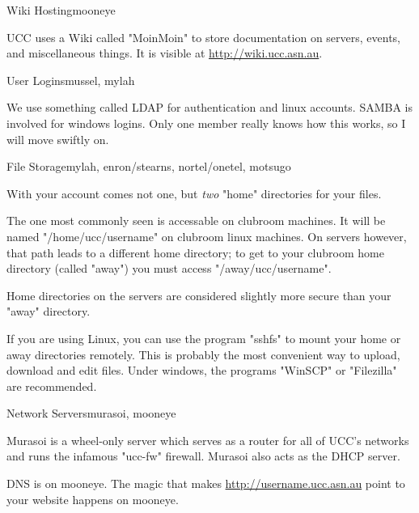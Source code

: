\begin{uccservice}{Wiki Hosting}{mooneye}

UCC uses a Wiki called "MoinMoin" to store documentation on servers, events, and miscellaneous things. It is visible at \url{http://wiki.ucc.asn.au}.

\end{uccservice}

\begin{uccservice}{User Logins}{mussel, mylah}

We use something called LDAP for authentication and linux accounts. SAMBA is involved for windows logins. Only one member really knows how this works, so I will move swiftly on.

\end{uccservice}

\begin{uccservice}{File Storage}{mylah, enron/stearns, nortel/onetel, motsugo}

With your account comes not one, but \emph{two} "home" directories for your files.

The one most commonly seen is accessable on clubroom machines. It will be named "/home/ucc/username" on clubroom linux machines. On servers however, that path leads to a different home directory; to get to your clubroom home directory (called "away") you must access "/away/ucc/username".

Home directories on the servers are considered slightly more secure than your "away" directory. 


If you are using Linux, you can use the program "sshfs" to mount your home or away directories remotely. This is probably the most convenient way to upload, download and edit files. Under windows, the programs "WinSCP" or "Filezilla" are recommended.


\end{uccservice}

\begin{uccservice}{Network Servers}{murasoi, mooneye}

Murasoi is a wheel-only server which serves as a router for all of UCC's networks and runs the infamous "ucc-fw" firewall. Murasoi also acts as the DHCP server.

DNS is on mooneye. The magic that makes \url{http://username.ucc.asn.au} point to your website happens on mooneye.

\end{uccservice}

